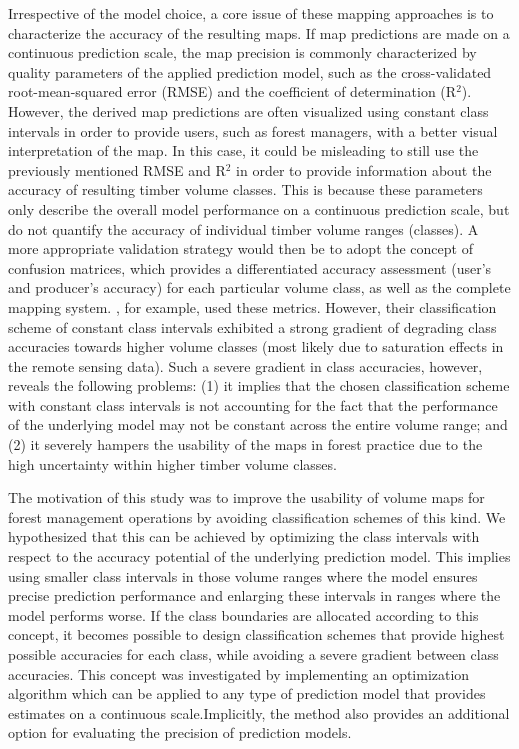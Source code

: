 Irrespective of the model choice, a core issue of these mapping approaches is to characterize the accuracy of the resulting maps. If map predictions are made on a continuous prediction scale, the map precision is commonly characterized by quality parameters of the applied prediction model, such as the cross-validated root-mean-squared error (RMSE) and the coefficient of determination (R$^2$). However, the derived map predictions are often visualized using constant class intervals in order to provide users, such as forest managers, with a better visual interpretation of the map. In this case, it could be misleading to still use the previously mentioned RMSE and R$^2$ in order to provide information about the accuracy of resulting timber volume classes. This is because these parameters only describe the overall model performance on a continuous prediction scale, but do not quantify the accuracy of individual timber volume ranges (classes). A more appropriate validation strategy would then be to adopt the concept of confusion matrices, which provides a differentiated accuracy assessment (user's and producer's accuracy) for each particular volume class, as well as the complete mapping system. \citet{franco2001}, for example, used these metrics. However, their classification scheme of constant class intervals exhibited a strong gradient of degrading class accuracies towards higher volume classes (most likely due to saturation effects in the remote sensing data). Such a severe gradient in class accuracies, however, reveals the following problems: (1) it implies that the chosen classification scheme with constant class intervals is not accounting for the fact that the performance of the underlying model may not be constant across the entire volume range; and (2) it severely hampers the usability of the maps in forest practice due to the high uncertainty within higher timber volume classes.\par
The motivation of this study was to improve the usability of volume maps for forest management operations by avoiding classification schemes of this kind. We hypothesized that this can be achieved by optimizing the class intervals with respect to the accuracy potential of the underlying prediction model. This implies using smaller class intervals in those volume ranges where the model ensures precise prediction performance and enlarging these intervals in ranges where the model performs worse. If the class boundaries are allocated according to this concept, it becomes possible to design classification schemes that provide highest possible accuracies for each class, while avoiding a severe gradient between class accuracies. This concept was investigated by implementing an optimization algorithm which can be applied to any type of prediction model that provides estimates on a continuous scale.Implicitly,   the   method   also   provides   an   additional   option   for   evaluating   the   precision   of prediction models.\par
